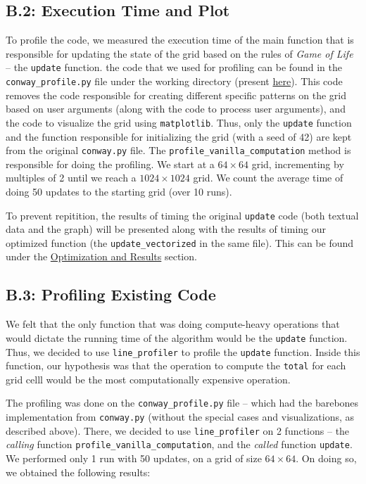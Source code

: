 \documentclass[a4paper,12pt]{article}
\begin{document}
\subsection{B.2: Execution Time and Plot}
To profile the code, we measured the execution time of the main function that is responsible for updating the state of the grid based on the rules of \textit{Game of Life} -- the \verb|update| function. the code that we used for profiling can be found in the \verb|conway_profile.py| file under the working directory (present \href{https://github.com/paulmyr/DD2358-HPC25/blob/master/02_hpcds/bonus/conway_profile.py}{here}). This code removes the code responsible for creating different specific patterns on the grid based on user arguments (along with the code to process user arguments), and the code to visualize the grid using \verb|matplotlib|. Thus, only the \verb|update| function and the function responsible for initializing the grid (with a seed of 42) are kept from the original \verb|conway.py| file. The \verb|profile_vanilla_computation| method is responsible for doing the profiling. We start at a $64 \times 64$ grid, incrementing by multiples of 2 until we reach a $1024 \times 1024$ grid. We count the average time of doing 50 updates to the starting grid (over 10 runs). 

To prevent repitition, the results of timing the original \verb|update| code (both textual data and the graph) will be presented along with the results of timing our optimized function (the \verb|update_vectorized| in the same file). This can be found under the \hyperref[sec:b4]{Optimization and Results} section.

\subsection{B.3: Profiling Existing Code}
\label{sec:b3}
We felt that the only function that was doing compute-heavy operations that would dictate the running time of the algorithm would be the \verb|update| function. Thus, we decided to use \verb|line_profiler| to profile the \verb|update| function. Inside this function, our hypothesis was that the operation to compute the \verb|total| for each grid celll would be the most computationally expensive operation. 

The profiling was done on the \verb|conway_profile.py| file -- which had the barebones implementation from \verb|conway.py| (without the special cases and visualizations, as described above). There, we decided to use \verb|line_profiler| on 2 functions -- the \textit{calling} function \verb|profile_vanilla_computation|, and the \textit{called} function \verb|update|. We performed only 1 run with 50 updates, on a grid of size $64 \times 64$. On doing so, we obtained the following results: 
\end{document}
